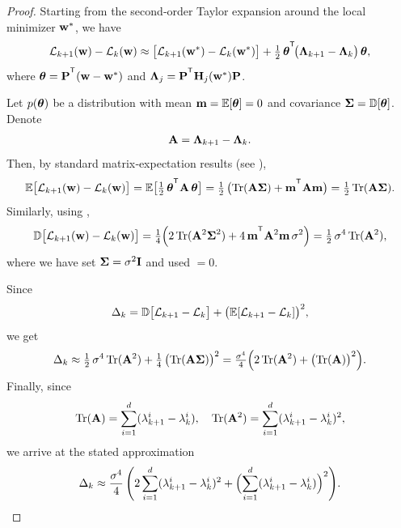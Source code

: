 \documentclass{article}
\begin{document}
\begin{proof}
  Starting from the second‐order Taylor expansion around the local minimizer $\mathbf{w}^*$, we have
  $$
    \cL_{k+1}(\bw) - \cL_k(\bw) \approx
    \bigl[ \cL_{k+1}(\bw^*) - \cL_k(\bw^*) \bigr] + \tfrac12\, \btheta^{\T}\! \bigl( \bLambda_{k+1} - \bLambda_k \bigr)\, \btheta,
  $$
  where $\btheta = \bP^{\T} (\bw-\bw^*)$ and $\bLambda_j = \bP^{\T} \bH_j(\bw^*) \bP$.

  Let $p(\boldsymbol{\theta})$ be a distribution with mean $\mathbf{m}=\mathbb E[\boldsymbol{\theta}] = 0$ and covariance $\boldsymbol{\Sigma} = \mathbb D[\boldsymbol{\theta}]$. Denote
  $$
    \mathbf{A}=\boldsymbol{\Lambda}_{k+1} - \boldsymbol{\Lambda}_k.
  $$
  Then, by standard matrix‐expectation results (see \cite[p.~35]{petersen2012matrix}),
  $$
    \mathbb E \bigl[ \cL_{k+1}(\bw) - \cL_k(\bw) \bigr] =
    \mathbb E \bigl[ \tfrac12\, \btheta^{\T} \bA\, \btheta \bigr] =
    \tfrac12\, \bigl( \tr(\bA \bSigma) + \bm^{\T} \bA \bm \bigr) =
    \tfrac12\, \tr(\bA \bSigma).
  $$
  Similarly, using \cite[p.~43]{petersen2012matrix},
  $$
    \mathbb D \bigl[ \cL_{k+1}(\bw) - \cL_k(\bw) \bigr] =
    \tfrac14 \Bigl( 2\, \tr(\bA^2 \bSigma^2) + 4\, \bm^{\T} \bA^2 \bm\, \sigma^2 \Bigr) =
    \tfrac12\, \sigma^4\, \tr(\bA^2),
  $$
  where we have set $\boldsymbol{\Sigma}=\sigma^2\mathbf I$ and used $\bm=0$.

  Since
  $$
    \Delta_k =
    \mathbb D \bigl[ \mathcal{L}_{k+1} - \mathcal{L}_k \bigr] + \bigl( \mathbb E [\mathcal{L}_{k+1} - \mathcal{L}_k] \bigr)^2,
  $$
  we get
  $$
    \Delta_k \approx
    \tfrac12\, \sigma^4\, \mathrm{Tr}(\mathbf{A}^2) + \tfrac14\, \bigl( \mathrm{Tr}(\mathbf{A} \boldsymbol{\Sigma}) \bigr)^2 =
    \tfrac{\sigma^4}{4} \Bigl( 2\, \mathrm{Tr}(\mathbf{A}^2) + \bigl( \mathrm{Tr}(\mathbf{A}) \bigr)^2 \Bigr).
  $$
  Finally, since
  $$
    \mathrm{Tr}(\mathbf{A}) =
    \sum_{i=1}^d (\lambda_{k+1}^i - \lambda_k^i), \quad
    \mathrm{Tr}(\mathbf{A}^2) =
    \sum_{i=1}^d( \lambda_{k+1}^i - \lambda_k^i)^2,
  $$
  we arrive at the stated approximation
  $$
    \Delta_k \approx
    \frac{\sigma^4}{4}\, \Biggl( 2 \sum_{i=1}^d (\lambda_{k+1}^i - \lambda_k^i)^2
    + \Bigl( \sum_{i=1}^d (\lambda_{k+1}^i - \lambda_k^i) \Bigr)^2 \Biggr).
  $$
\end{proof}
\end{document}
